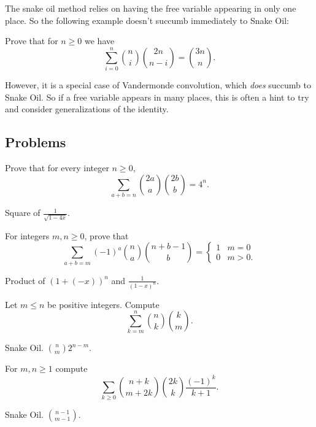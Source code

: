 \documentclass[11pt]{scrartcl}
\begin{document}
The snake oil method relies on having the free variable appearing in only one place.
So the following example doesn't succumb immediately to Snake Oil:
\begin{mdframed}
	Prove that for $n \ge 0$ we have
	\[ \sum_{i=0}^n \binom ni \binom{2n}{n-i} = \binom{3n}{n}. \]
\end{mdframed}
However, it is a special case of Vandermonde convolution,
which \emph{does} succumb to Snake Oil.
So if a free variable appears in many places,
this is often a hint to try and consider generalizations of the identity.

\subsection{Problems}
\begin{problem}
	Prove that for every integer $n \ge 0$,
	\[ \sum_{a+b=n} \binom{2a}{a} \binom{2b}{b} = 4^n. \]
	\begin{hint}
		Square of $\frac{1}{\sqrt{1-4x}}$.
	\end{hint}
\end{problem}

\begin{problem}
	For integers $m,n \ge 0$, prove that
	\[ \sum_{a+b=m} (-1)^a \binom na \binom{n+b-1}{b} =
		\begin{cases}
			1 & m = 0 \\
			0 & m > 0.
		\end{cases}
	\]
	\begin{hint}
		Product of $(1+(-x))^n$ and $\frac{1}{(1-x)^n}$.
	\end{hint}
\end{problem}

\begin{problem}
	Let $m \le n$ be positive integers.
	Compute \[ \sum_{k=m}^n \binom nk \binom km.  \]
	\begin{hint}
		Snake Oil. $\binom nm 2^{n-m}$.
	\end{hint}
\end{problem}

\begin{problem}
	For $m,n \ge 1$ compute
	\[ \sum_{k \ge 0} \binom{n+k}{m+2k}
		\binom{2k}{k} \frac{(-1)^k}{k+1}. \]
	\begin{hint}
		Snake Oil. $\binom{n-1}{m-1}$.
	\end{hint}
\end{problem}
\end{document}
